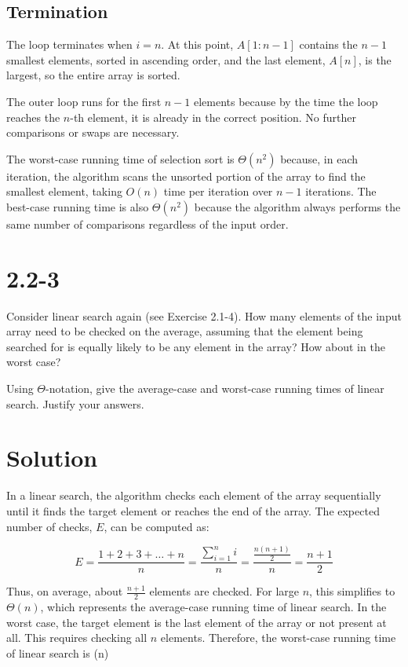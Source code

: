 \documentclass{article}
\begin{document}
\subsection*{Termination}
The loop terminates when $i = n$. At this point, $A[1:n-1]$ contains the $n-1$ smallest elements, sorted in ascending order, and the last element, $A[n]$, is the largest, so the entire array is sorted.
 
The outer loop runs for the first $n-1$ elements because by the time the loop reaches the $n$-th element, it is already in the correct position. No further comparisons or swaps are necessary.


The worst-case running time of selection sort is $\Theta(n^2)$ because, in each iteration, the algorithm scans the unsorted portion of the array to find the smallest element, taking $O(n)$ time per iteration over $n-1$ iterations. The best-case running time is also $\Theta(n^2)$ because the algorithm always performs the same number of comparisons regardless of the input order.


\section*{2.2-3}

\text Consider linear search again (see Exercise 2.1-4). How many elements of the input array need to be checked on the average, assuming that the element being searched for is equally likely to be any element in the array? How about in the worst case?

Using $\Theta$-notation, give the average-case and worst-case running times of linear search. Justify your answers.

\section*{Solution}

In a linear search, the algorithm checks each element of the array sequentially until it finds the target element or reaches the end of the array. 
The expected number of checks, $E$, can be computed as:

\[
E = \frac{1 + 2 + 3 + \ldots + n}{n} = \frac{\sum_{i=1}^{n} i}{n} = \frac{\frac{n(n+1)}{2}}{n} = \frac{n+1}{2}
\]

Thus, on average, about $\frac{n+1}{2}$ elements are checked. For large $n$, this simplifies to $\Theta(n)$, which represents the average-case running time of linear search.
In the worst case, the target element is the last element of the array or not present at all. This requires checking all $n$ elements.
Therefore, the worst-case running time of linear search is \Theta(n) 
\end{document}
